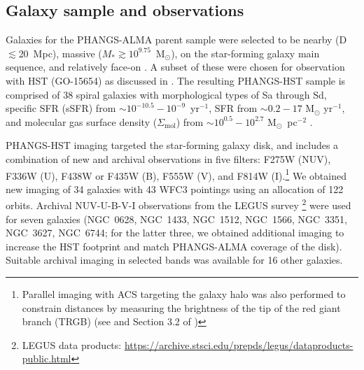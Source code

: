 \documentclass[linenumbers]{aastex63}
\newcommand{\msun}{M$_{\odot}$}
\newcommand{\sfr}{M$_{\odot}$ yr$^{-1}$}
\begin{document}
\subsection{Galaxy sample and observations}
Galaxies for the PHANGS-ALMA parent sample were selected to be nearby (D$\lesssim$20~Mpc), massive ($M_{*} \gtrsim 10^{9.75}$~\msun), on the star-forming galaxy main sequence, and relatively face-on \citep{leroy_phangs-alma_2021}.  A subset of these were chosen for observation with HST (GO-15654) as discussed in \citet{lee_phangs-hst_2022}. The resulting PHANGS-HST sample is comprised of 38 spiral galaxies with morphological types of Sa through Sd, specific SFR (sSFR) from ${\sim}10^{-10.5} {-} 10^{-9}$~yr$^{-1}$, SFR from ${\sim}0.2{-}17$ \sfr, and molecular gas surface density ($\Sigma_{\mbox{mol}}$) from ${\sim}10^{0.5}{-}10^{2.7}$ \msun~pc$^{-2}$ \citep[see ][Table 1 \& Figure 1]{lee_phangs-hst_2022}.

PHANGS-HST imaging targeted the star-forming galaxy disk, and includes a combination of new and archival observations in five filters: F275W (NUV), F336W (U), F438W or F435W (B), F555W (V), and F814W (I).\footnote{Parallel imaging with ACS targeting the galaxy halo was also performed to constrain distances by measuring the brightness of the tip of the red giant branch (TRGB) (see \citealt{anand_distances_2021} and Section 3.2 of \citealt{lee_phangs-hst_2022})} We obtained new imaging of 34 galaxies with 43 WFC3 pointings using an allocation of 122 orbits.  Archival NUV-U-B-V-I observations from the LEGUS survey \citep{calzetti_legacy_2015}\footnote{LEGUS data products: \url{https://archive.stsci.edu/prepds/legus/dataproducts-public.html}} were used for seven galaxies (NGC~0628, NGC~1433, NGC~1512, NGC~1566, NGC~3351, NGC~3627, NGC~6744; for the latter three, we obtained additional imaging to increase the HST footprint and match PHANGS-ALMA coverage of the disk).  Suitable archival imaging in selected bands was available for 16 other galaxies.
\end{document}
